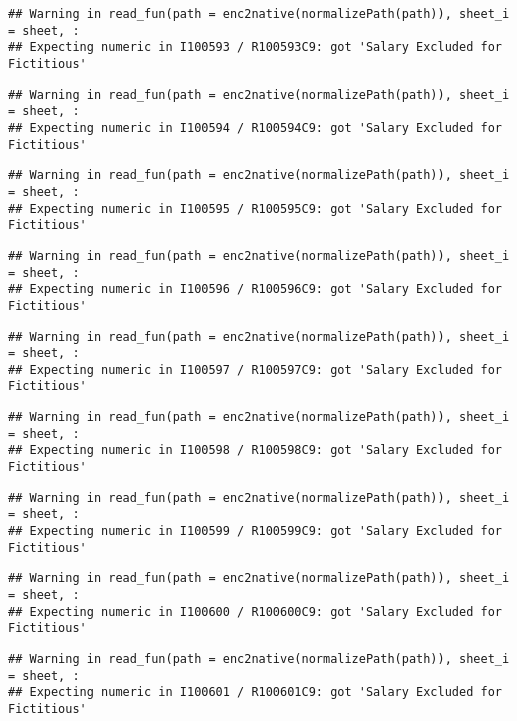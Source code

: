 \documentclass[
]{article}
\begin{document}
\begin{verbatim}
## Warning in read_fun(path = enc2native(normalizePath(path)), sheet_i = sheet, :
## Expecting numeric in I100593 / R100593C9: got 'Salary Excluded for Fictitious'
\end{verbatim}

\begin{verbatim}
## Warning in read_fun(path = enc2native(normalizePath(path)), sheet_i = sheet, :
## Expecting numeric in I100594 / R100594C9: got 'Salary Excluded for Fictitious'
\end{verbatim}

\begin{verbatim}
## Warning in read_fun(path = enc2native(normalizePath(path)), sheet_i = sheet, :
## Expecting numeric in I100595 / R100595C9: got 'Salary Excluded for Fictitious'
\end{verbatim}

\begin{verbatim}
## Warning in read_fun(path = enc2native(normalizePath(path)), sheet_i = sheet, :
## Expecting numeric in I100596 / R100596C9: got 'Salary Excluded for Fictitious'
\end{verbatim}

\begin{verbatim}
## Warning in read_fun(path = enc2native(normalizePath(path)), sheet_i = sheet, :
## Expecting numeric in I100597 / R100597C9: got 'Salary Excluded for Fictitious'
\end{verbatim}

\begin{verbatim}
## Warning in read_fun(path = enc2native(normalizePath(path)), sheet_i = sheet, :
## Expecting numeric in I100598 / R100598C9: got 'Salary Excluded for Fictitious'
\end{verbatim}

\begin{verbatim}
## Warning in read_fun(path = enc2native(normalizePath(path)), sheet_i = sheet, :
## Expecting numeric in I100599 / R100599C9: got 'Salary Excluded for Fictitious'
\end{verbatim}

\begin{verbatim}
## Warning in read_fun(path = enc2native(normalizePath(path)), sheet_i = sheet, :
## Expecting numeric in I100600 / R100600C9: got 'Salary Excluded for Fictitious'
\end{verbatim}

\begin{verbatim}
## Warning in read_fun(path = enc2native(normalizePath(path)), sheet_i = sheet, :
## Expecting numeric in I100601 / R100601C9: got 'Salary Excluded for Fictitious'
\end{verbatim}
\end{document}
